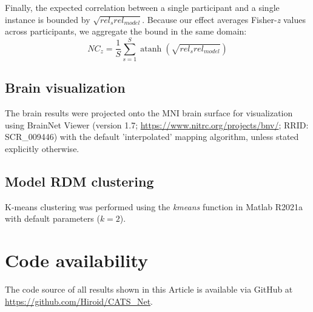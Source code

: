 \documentclass[pdflatex,sn-mathphys-num,lineno]{sn-jnl}%
\DeclareMathOperator{\atanh}{atanh}
\begin{document}
\begin{CJK}{UTF8}{gbsn}
Finally, the expected correlation between a single participant and a single instance is bounded by $\sqrt{rel_{s}rel_{model}}$. Because our effect averages Fisher-\textit{z} values across participants, we aggregate the bound in the same domain:
\[
NC_z = \frac{1}{S}\sum_{s=1}^{S}\atanh(\sqrt{rel_{s}rel_{model}})
\]

\subsection{Brain visualization}
The brain results were projected onto the MNI brain surface for visualization using BrainNet Viewer \cite{xia_brainnet_2013} (version 1.7; \url{https://www.nitrc.org/projects/bnv/}; RRID: SCR\_009446) with the default 'interpolated' mapping algorithm, unless stated explicitly otherwise.

\subsection{Model RDM clustering}
K-means clustering was performed using the \textit{kmeans} function in Matlab R2021a with default parameters ($k = 2$).

\section{Code availability}
The code source of all results shown in this Article is available via GitHub at \url{https://github.com/Hiroid/CATS_Net}.

\newpage




\end{CJK}
\end{document}
